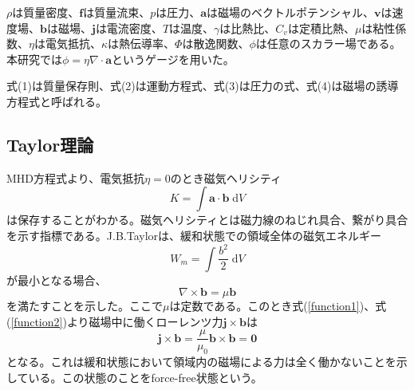 \documentclass[12pt]{jsarticle}
\begin{document}
$\rho$は質量密度、$\bm{f}$は質量流束、$p$は圧力、$\bm{a}$は磁場のベクトルポテンシャル、$\bm{v}$は速度場、$\bm{b}$は磁場、$\bm{j}$は電流密度、$T$は温度、$\gamma$は比熱比、$C_v$は定積比熱、$\mu$は粘性係数、$\eta$は電気抵抗、$\kappa$は熱伝導率、$\Phi$は散逸関数、$\phi$は任意のスカラー場である。本研究では$\phi=\eta\nabla\cdot\bm{a}$というゲージを用いた。

式(1)は質量保存則、式(2)は運動方程式、式(3)は圧力の式、式(4)は磁場の誘導方程式と呼ばれる。




\subsection{Taylor理論}
MHD方程式より、電気抵抗$\eta=0$のとき磁気ヘリシティ
\begin{equation}
K=\int \bm{a}\cdot\bm{b}\;\mathrm{d}V
\end{equation}
は保存することがわかる。磁気ヘリシティとは磁力線のねじれ具合、繋がり具合を示す指標である。J.B.Taylorは、緩和状態での領域全体の磁気エネルギー
\begin{equation}
W_m=\int \frac{b^2}{2}\;\mathrm{d}V
\end{equation}
が最小となる場合、
\begin{equation} \label{function2}
\nabla\times\bm{b}= \mu\bm{b}
\end{equation}
を満たすことを示した\cite{taylor1974relaxation}\cite{ortolani1993magnetohydrodynamics}。ここで$\mu$は定数である。このとき式(\ref{function1})、式(\ref{function2})より磁場中に働くローレンツ力$\bm{j}\times\bm{b}$は
\begin{equation}
\bm{j}\times\bm{b}= \frac{\mu}{\mu_0}\bm{b}\times\bm{b}=\bm{0}
\end{equation}
となる。これは緩和状態において領域内の磁場による力は全く働かないことを示している。この状態のことをforce-free状態という。
\end{document}
